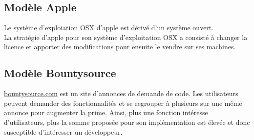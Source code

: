     \subsection{Modèle Apple}

Le système d'exploiation OSX d'apple est dérivé d'un système ouvert.\\
La stratégie d'apple pour son système d'exploitation OSX a consisté à changer la
licence et apporter des modifications pour ensuite le vendre sur ses machines.

    \subsection{Modèle Bountysource}

\url{bountysource.com} est un site d'annonces de demande de code. Les
utilisateurs peuvent demander des fonctionnalités et se regrouper à plusieurs
sur une même annonce pour augmenter la prime. Ainsi, plus une fonction intéresse
d'utilisateurs, plus la somme proposée pour son implémentation est élevée et
donc susceptible d'intéresser un développeur.

\paragraph{}
